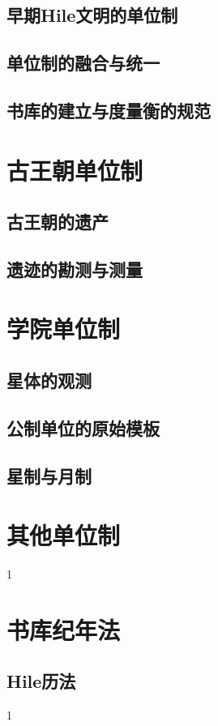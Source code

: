 \documentclass[UTF8,12pt,draft]{ctexbook}
\begin{document}
            \subsection{早期Hile文明的单位制}
            \subsection{单位制的融合与统一}
            \subsection{书库的建立与度量衡的规范}
        \section{古王朝单位制}
            \subsection{古王朝的遗产}
            \subsection{遗迹的勘测与测量}
        \section{学院单位制}
            \subsection{星体的观测}
            \subsection{公制单位的原始模板}
            \subsection{星制与月制}
        \section{其他单位制}
            1
        \section{书库纪年法}
            \subsection{Hile历法}
                1
\end{document}
